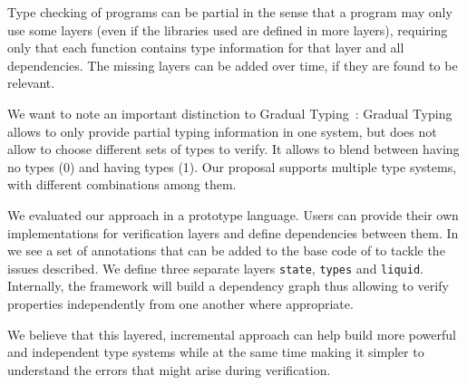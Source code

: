 \documentclass{easychair}
\begin{document}
Type checking of programs can be partial in the sense that a program may only use some layers (even if the libraries used are defined in more layers), requiring only that each function contains type information for that layer and all dependencies. The missing layers can be added over time, if they are found to be relevant.


We want to note an important distinction to Gradual Typing~\cite{gradual,gradual-objects}: Gradual Typing allows to only provide partial typing information in one system, but does not allow to choose different sets of types to verify. It allows to blend between having no types (0) and having types (1). Our proposal supports multiple type systems, with different combinations among them.

We evaluated our approach in a prototype language. Users can provide their own implementations for verification layers and define dependencies between them. In  we see a set of annotations that can be added to the base code of  to tackle the issues described. We define three separate layers \texttt{state}, \texttt{types} and \texttt{liquid}. Internally, the framework will build a dependency graph thus allowing to verify properties independently from one another where appropriate.

We believe that this layered, incremental approach can help build more powerful and independent type systems while at the same time making it simpler to understand the errors that might arise during verification.





\end{document}
